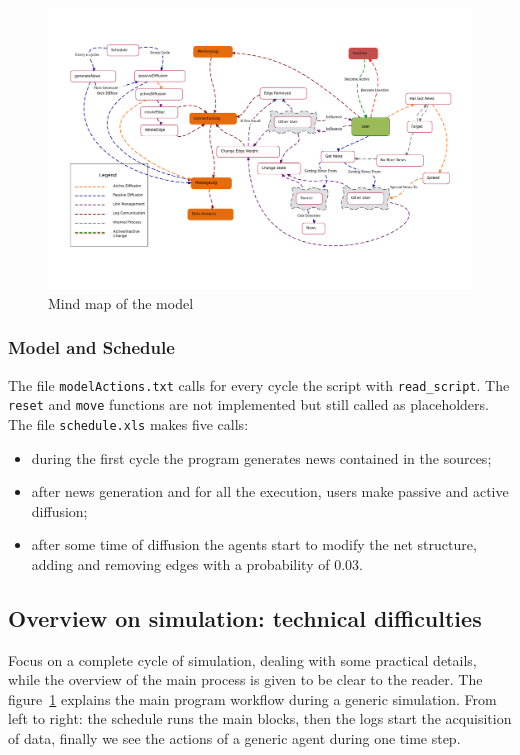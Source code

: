 \begin{figure}[htpb]
  \centering
  \includegraphics[trim={2cm 3cm 1.5cm 2cm}, clip,width=\columnwidth]{img/pdf/mindMap.pdf}
  \caption{Mind map of the model}
  \label{fig:mindmap}
\end{figure}

\subsubsection{Model and Schedule}
The file \texttt{modelActions.txt} calls for every cycle the script with
\texttt{read\_script}.
The \texttt{reset} and \texttt{move} functions are not implemented
but still called as placeholders.
The file \texttt{schedule.xls} makes five calls:
\begin{itemize}
\item [timestep 1] during the first cycle the program generates news
  contained in the sources;
\item [timesteps 2 - 10000] after news generation and for all
  the execution, users make passive and active diffusion;
\item [timesteps 10 - 10000] after some time of diffusion the agents start
  to modify the net structure, adding and removing edges with a probability
  of 0.03.
\end{itemize}

\subsection{Overview on simulation: technical difficulties}
Focus on a complete cycle of simulation, dealing with some
practical details, while the overview of the main process is given to be
clear to the reader. The figure~\ref{fig:mindmap} explains the main program
workflow during a generic simulation.
From left to right: the schedule runs the main blocks, then the logs start
the acquisition of data, finally we see the actions of a generic agent
during one time step.

